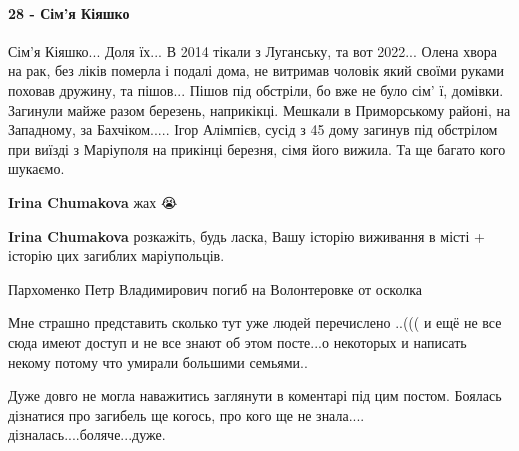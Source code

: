  
 
 
 
 

\paragraph{28 - Сім'я Кіяшко}

\raggedcolumns
\begin{multicols}{2} %
\setlength{\parindent}{0pt}

\begin{itemize} %

Сім'я Кіяшко... Доля їх... В 2014 тікали з Луганську, та вот 2022... Олена хвора
на рак, без ліків померла і подалі дома, не витримав чоловік який своїми руками
поховав дружину, та пішов... Пішов під обстріли, бо вже не було сім' ї,
домівки. Загинули майже разом березень, наприкікці. Мешкали в Приморському
районі, на Западному, за Бахчіком..... Ігор Алімпієв, сусід з 45 дому загинув
під обстрілом при виїзді з Маріуполя на прикінці березня, сімя його вижила. Та
ще багато кого шукаємо.

\begin{itemize} %
\textbf{Irina Chumakova} жах 😭

\textbf{Irina Chumakova} розкажіть, будь ласка, Вашу історію виживання в місті + історію цих загиблих маріупольців. 💙
\end{itemize} %


Пархоменко Петр Владимирович погиб на Волонтеровке от осколка


Мне страшно представить сколько тут уже людей перечислено ..((( и ещё не все
сюда имеют доступ и не все знают об этом посте...о некоторых и написать некому
потому что умирали большими семьями..


Дуже довго не могла наважитись заглянути в коментарі під цим постом. Боялась
дізнатися про загибель ще когось, про кого ще не знала....
дізналась....боляче...дуже.


\end{itemize}
\end{multicols}
